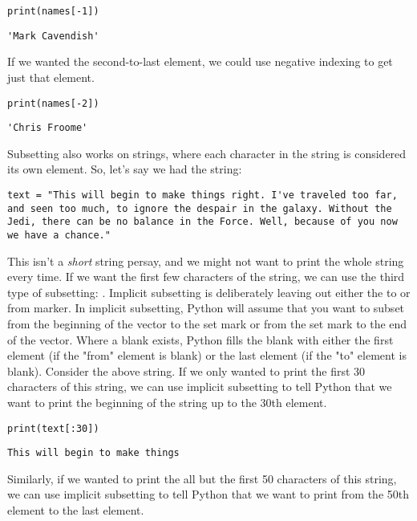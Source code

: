 \begin{lstlisting}[style=pippython]
print(names[-1])
\end{lstlisting}
\begin{lstlisting}[style=none]
'Mark Cavendish'
\end{lstlisting}
If we wanted the second-to-last element, we could use negative indexing to get just that element.\par
\begin{lstlisting}[style=pippython]
print(names[-2])
\end{lstlisting}
\begin{lstlisting}[style=none]
'Chris Froome'
\end{lstlisting}
Subsetting also works on strings, where each character in the string is considered its own element. So, let's say we had the string:
\begin{lstlisting}[style=pippython]
text = "This will begin to make things right. I've traveled too far, and seen too much, to ignore the despair in the galaxy. Without the Jedi, there can be no balance in the Force. Well, because of you now we have a chance."
\end{lstlisting}
This isn't a \textit{short} string persay, and we might not want to print the whole string every time. If we want the first few characters of the string, we can use the third type of subsetting: . Implicit subsetting is deliberately leaving out either the to or from marker. In implicit subsetting, Python will assume that you want to subset from the beginning of the vector to the set mark or from the set mark to the end of the vector. Where a blank exists, Python fills the blank with either the first element (if the "from" element is blank) or the last element (if the "to" element is blank). Consider the above string. If we only wanted to print the first 30 characters of this string, we can use implicit subsetting to tell Python that we want to print the beginning of the string up to the 30th element.\par
\begin{lstlisting}[style=pippython]
print(text[:30])
\end{lstlisting}
\begin{lstlisting}[style=none]
This will begin to make things
\end{lstlisting}
Similarly, if we wanted to print the all but the first 50 characters of this string, we can use implicit subsetting to tell Python that we want to print from the 50th element to the last element.
